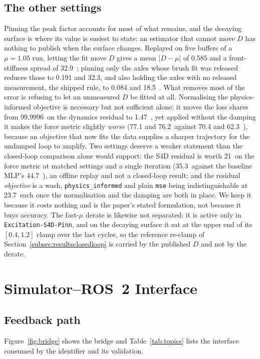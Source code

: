 \documentclass[lineno,12pt]{sn-jnl}
\makeatletter
\newif\ifsiu@prev
\DeclareRobustCommand{\siu@sep}{\ifsiu@prev\,\fi}
\DeclareRobustCommand{\siu@unit}[1]{\siu@sep\text{#1}\siu@prevtrue}
\DeclareRobustCommand{\siu@pre}[1]{\siu@sep\text{#1}\siu@prevfalse}
\DeclareRobustCommand{\siu@div}[1]{\text{#1}\siu@prevfalse}
\DeclareRobustCommand{\meter}{m}
\DeclareRobustCommand{\second}{s}
\DeclareRobustCommand{\gram}{g}
\DeclareRobustCommand{\newton}{N}
\DeclareRobustCommand{\radian}{rad}
\DeclareRobustCommand{\hertz}{Hz}
\DeclareRobustCommand{\percent}{\%}
\DeclareRobustCommand{\g}{\textit{g}}
\DeclareRobustCommand{\kilo}{k}
\DeclareRobustCommand{\milli}{m}
\DeclareRobustCommand{\per}{/}
\DeclareRobustCommand{\squared}{\ensuremath{^{2}}}
\providecommand{\degree}{\ensuremath{^{\circ}}}
\DeclareRobustCommand{\si}[1]{\begingroup
  \siu@prevfalse
  \renewcommand{\meter}{\siu@unit{m}}%
  \renewcommand{\second}{\siu@unit{s}}%
  \renewcommand{\gram}{\siu@unit{g}}%
  \renewcommand{\newton}{\siu@unit{N}}%
  \renewcommand{\radian}{\siu@unit{rad}}%
  \renewcommand{\hertz}{\siu@unit{Hz}}%
  \renewcommand{\percent}{\siu@unit{\%}}%
  \renewcommand{\degree}{\siu@unit{\ensuremath{^{\circ}}}}%
  \renewcommand{\g}{\siu@unit{\textit{g}}}%
  \renewcommand{\kilo}{\siu@pre{k}}%
  \renewcommand{\milli}{\siu@pre{m}}%
  \renewcommand{\per}{\siu@div{/}}%
  \renewcommand{\squared}{\ensuremath{^{2}}}%
  #1\endgroup}
\DeclareRobustCommand{\num}[1]{#1}
\DeclareRobustCommand{\SI}[2]{#1\,\si{#2}}
\newcommand{\oursarm}{\texttt{Excitation-\allowbreak S4D-\allowbreak Pinn}}
\theoremstyle{thmstyleone}%
\theoremstyle{thmstyletwo}%
\theoremstyle{thmstylethree}%
\makeatother
\begin{document}
\begin{appendices}
\subsection*{The other settings}
Pinning the peak factor accounts for most of what remains, and the decaying
surface is where its value is easiest to state: an estimator that cannot move
$D$ has nothing to publish when the surface changes. Replayed on five buffers
of a $\mu=\num{1.05}$ run, letting the fit move $D$ gives a mean $|D-\mu|$ of
\num{0.585} and a front-stiffness spread of
\SI{32.9}{\kilo\newton\per\radian}; pinning only the axles whose brush fit was
released reduces those to \num{0.191} and \num{32.3}, and also holding the axles
with no released measurement, the shipped rule, to \num{0.084} and
\SI{18.5}{\kilo\newton\per\radian}. What removes most of the error is refusing
to let an unmeasured $D$ be fitted at all. Normalising the physics-informed
objective is necessary but not sufficient alone: it moves the loss shares from
\SI{99.9996}{\percent} on the dynamics residual to \SI{1.47}{\percent}, yet
applied without the damping it makes the force metric slightly \emph{worse}
(\num{77.1} and \SI{76.2}{\newton} against \num{70.4} and \SI{62.3}{\newton}),
because an objective that now fits the data supplies a sharper trajectory for
the undamped loop to amplify. Two settings deserve a weaker statement than the
closed-loop comparison alone would support: the S4D residual is worth
\SI{21}{\percent} on the force metric at matched settings and a single iteration
(\SI{35.3}{\newton} against the baseline MLP's \SI{44.7}{\newton}), an offline
replay and not a closed-loop result; and the residual \emph{objective} is a
wash, \texttt{physics\_informed} and plain \texttt{mse} being indistinguishable
at \SI{23.7}{\newton} each once the normalisation and the damping are both in
place. We keep it because it costs nothing and is the paper's stated
formulation, not because it buys accuracy. The fast-$\mu$ derate is likewise
not separated: it is active only in \oursarm{}, and on the decaying surface it
sat at the upper end of its $[\num{0.4},\num{1.2}]$ clamp over the last cycles,
so the reference re-clamp of Section~\ref{subsec:resultsclosedloop} is carried
by the published $D$ and not by the derate.

\section{Simulator--ROS~2 Interface}
\label{sec:iface}

\subsection*{Feedback path}
Figure~\ref{fig:bridge} shows the bridge and Table~\ref{tab:topics} lists the
interface consumed by the identifier and its validation.


\end{appendices}
\end{document}
